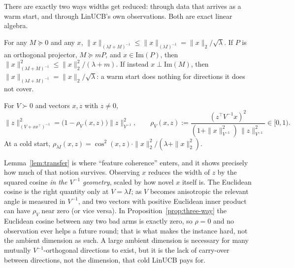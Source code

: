 \documentclass[anon]{alt2027} %
\begin{document}
There are exactly two ways widths get reduced: through data that arrives as a
warm start, and through LinUCB's own observations. Both are exact linear
algebra.

\begin{lemma}
\label{lem:loewner}
For any $M\succeq0$ and any $x$, $\|x\|_{(\lambda I+M)^{-1}}\le\|x\|_{(\lambda I)^{-1}}=\|x\|_2/\sqrt\lambda$.
If $P$ is an orthogonal projector, $M\succeq mP$, and $x\in\mathrm{Im}(P)$, then
$\|x\|^2_{(\lambda I+M)^{-1}}\le\|x\|_2^2/(\lambda+m)$. If instead $x\perp\mathrm{Im}(M)$,
then $\|x\|_{(\lambda I+M)^{-1}}=\|x\|_2/\sqrt\lambda$: a warm start does nothing
for directions it does not cover.
\end{lemma}

\begin{lemma}
\label{lem:transfer}
For $V\succ0$ and vectors $x,z$ with $z\ne0$,
\[
\|z\|^2_{(V+xx^\top)^{-1}}=\bigl(1-\rho_V(x,z)\bigr)\|z\|^2_{V^{-1}},
\qquad
\rho_V(x,z):=\frac{(z^\top V^{-1}x)^2}{(1+\|x\|^2_{V^{-1}})\,\|z\|^2_{V^{-1}}}\in[0,1).
\]
At a cold start, $\rho_{\lambda I}(x,z)=\cos^2(x,z)\cdot\|x\|_2^2/(\lambda+\|x\|_2^2)$.
\end{lemma}

Lemma~\ref{lem:transfer} is where ``feature coherence'' enters, and it shows
precisely how much of that notion survives. Observing $x$ reduces the width of
$z$ by the squared cosine \emph{in the $V^{-1}$ geometry}, scaled by how novel
$x$ itself is. The Euclidean cosine is the right quantity only at $V=\lambda I$;
as $V$ becomes anisotropic the relevant angle is measured in $V^{-1}$, and two
vectors with positive Euclidean inner product can have $\rho_V$ near zero (or
vice versa). In Proposition~\ref{prop:three-way} the Euclidean cosine between
any two bad arms is exactly zero, so $\rho=0$ and no observation ever helps a
future round; that is what makes the instance hard, not the ambient dimension
as such. A large ambient dimension is necessary for many mutually
$V^{-1}$-orthogonal directions to exist, but it is the lack of carry-over
between directions, not the dimension, that cold LinUCB pays for.
\end{document}
